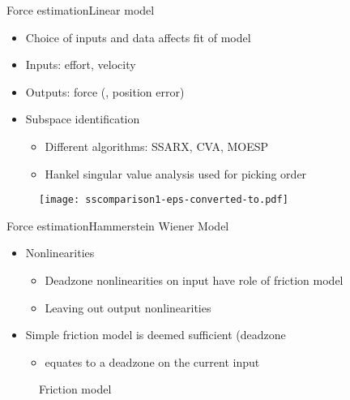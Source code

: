 \begin{frame}{Force estimation}{Linear model}
\begin{itemize}
  \item Choice of inputs and data affects fit of model
  \item Inputs: effort, velocity 
  \item Outputs: force (, position error)
  \item Subspace identification
	\begin{itemize}
	\item Different algorithms: SSARX, CVA, MOESP
	\item Hankel singular value analysis used for picking order
	\end{itemize}
\end{itemize}
	
	\begin{figure}
	\centering
	\texttt{[image: sscomparison1-eps-converted-to.pdf]}
	\end{figure}
\end{frame}
\begin{frame}{Force estimation}{Hammerstein Wiener Model}
\begin{itemize}
  \item Nonlinearities
  \begin{itemize}
    \item Deadzone nonlinearities on input have role of friction model
    \item Leaving out output nonlinearities
  \end{itemize}  
  \item Simple friction model is deemed sufficient (deadzone
  \begin{itemize}
  \item equates to a deadzone on the current input
  \end{itemize}
\end{itemize}
\begin{figure}[h]
\centering
\caption{Friction model}
\label{fig:new_friction_model}
\end{figure}
\end{frame}

